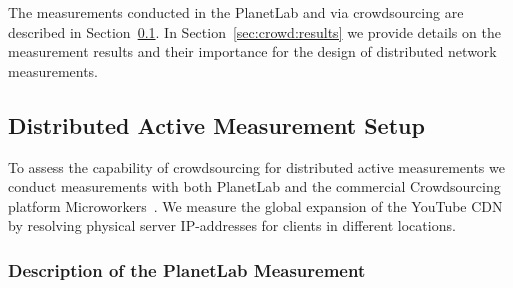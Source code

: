 
The measurements conducted in the PlanetLab and via crowdsourcing are described in Section~\ref{sec:crowd:method}.
In Section~\ref{sec:crowd:results} we provide details on the measurement results and their importance for the design of distributed network measurements.

%
\subsection{Distributed Active Measurement Setup}
\label{sec:crowd:method}

To assess the capability of crowdsourcing for distributed active measurements we conduct measurements with both  PlanetLab and the commercial Crowdsourcing platform Microworkers~\cite{microworkers}.
We measure the global expansion of the YouTube CDN by resolving physical server IP-addresses for clients in different locations.

\subsubsection{Description of the PlanetLab Measurement}

